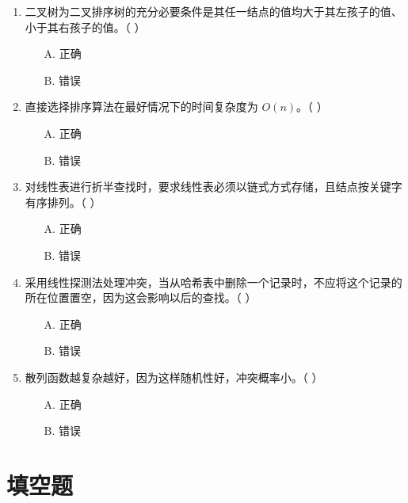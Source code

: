 \documentclass[12pt, a4paper]{article}
\begin{document}
\begin{enumerate}[label=\arabic*.]
	\item 二叉树为二叉排序树的充分必要条件是其任一结点的值均大于其左孩子的值、小于其右孩子的值。（ ）
	      \begin{enumerate}
		      \item[A.] 正确
		      \item[B.] 错误
	      \end{enumerate}

	\item 直接选择排序算法在最好情况下的时间复杂度为 $O(n)$。（ ）
	      \begin{enumerate}
		      \item[A.] 正确
		      \item[B.] 错误
	      \end{enumerate}

	\item 对线性表进行折半查找时，要求线性表必须以链式方式存储，且结点按关键字有序排列。（ ）
	      \begin{enumerate}
		      \item[A.] 正确
		      \item[B.] 错误
	      \end{enumerate}

	\item 采用线性探测法处理冲突，当从哈希表中删除一个记录时，不应将这个记录的所在位置置空，因为这会影响以后的查找。（ ）
	      \begin{enumerate}
		      \item[A.] 正确
		      \item[B.] 错误
	      \end{enumerate}

	\item 散列函数越复杂越好，因为这样随机性好，冲突概率小。（ ）
	      \begin{enumerate}
		      \item[A.] 正确
		      \item[B.] 错误
	      \end{enumerate}
\end{enumerate}

\section*{填空题}
\end{document}
